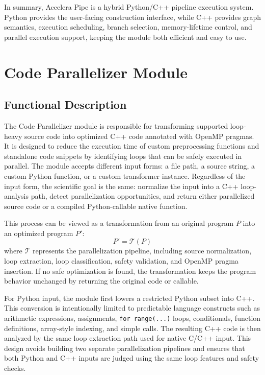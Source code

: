 In summary, Accelera Pipe is a hybrid Python/C++ pipeline execution system.
Python provides the user-facing construction interface, while C++ provides graph
semantics, execution scheduling, branch selection, memory-lifetime control, and
parallel execution support, keeping the module both efficient and easy to use.


\section{Code Parallelizer Module}

\subsection{Functional Description}

The Code Parallelizer module is responsible for transforming supported loop-heavy
source code into optimized C++ code annotated with OpenMP pragmas. It is designed
to reduce the execution time of custom preprocessing functions and standalone code
snippets by identifying loops that can be safely executed in parallel. The module
accepts different input forms: a file path, a source string, a custom Python function,
or a custom transformer instance. Regardless of the input form, the scientific goal is
the same: normalize the input into a C++ loop-analysis path, detect parallelization
opportunities, and return either parallelized source code or a compiled
Python-callable native function.

This process can be viewed as a transformation from an original program \(P\) into
an optimized program \(P'\):
\[
P' = \mathcal{T}(P)
\]
where \(\mathcal{T}\) represents the parallelization pipeline, including source
normalization, loop extraction, loop classification, safety validation, and OpenMP
pragma insertion. If no safe optimization is found, the transformation keeps the
program behavior unchanged by returning the original code or callable.

For Python input, the module first lowers a restricted Python subset into C++. This
conversion is intentionally limited to predictable language constructs such as
arithmetic expressions, assignments, \texttt{for range(...)} loops, conditionals,
function definitions, array-style indexing, and simple calls. The resulting C++ code is
then analyzed by the same loop extraction path used for native C/C++ input. This
design avoids building two separate parallelization pipelines and ensures that both
Python and C++ inputs are judged using the same loop features and safety checks.

